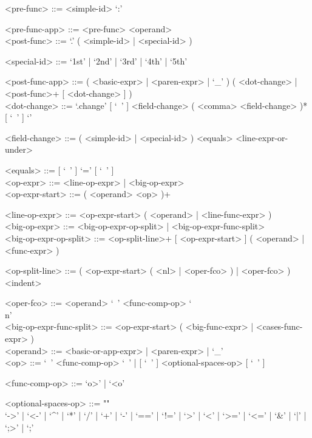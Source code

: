 \documentclass[diploma]{softlab-thesis}
\begin{document}
\begin{grammar}
<pre-func> ::= <simple-id> `:'

<pre-func-app> ::= <pre-func> <operand>
\\

<post-func> ::= `.' ( <simple-id> | <special-id> )

<special-id> ::= `1st' | `2nd' | `3rd' | `4th' | `5th'

<post-func-app> ::=
( <basic-expr> | <paren-expr> | `_' )
( <dot-change> | <post-func>+ [ <dot-change> ] )
\\

<dot-change> ::=
`.change{' [ `\ ' ] <field-change> ( <comma> <field-change> )* [ `\ ' ] `}'

<field-change> ::= ( <simple-id> | <special-id> ) <equals> <line-expr-or-under>

<equals> ::= [ `\ ' ] `=' [ `\ ' ]
\\

<op-expr> ::= <line-op-expr> | <big-op-expr>
\\

<op-expr-start> ::= ( <operand> <op> )+

<line-op-expr> ::= <op-expr-start> ( <operand> | <line-func-expr> )
\\

<big-op-expr> ::=
<big-op-expr-op-split> | <big-op-expr-func-split>
\\

<big-op-expr-op-split> ::=
<op-split-line>+ [ <op-expr-start> ] ( <operand> | <func-expr> )

<op-split-line> ::=
( <op-expr-start> ( <nl> | <oper-fco> ) | <oper-fco> ) <indent>

<oper-fco> ::= <operand> `\ ' <func-comp-op> `\\n'
\\

<big-op-expr-func-split> ::=
<op-expr-start> ( <big-func-expr> | <cases-func-expr> )
\\

<operand> ::= <basic-or-app-expr> | <paren-expr> | `_'
\\

<op> ::= `\ ' <func-comp-op> `\ ' | [ `\ ' ] <optional-spaces-op> [ `\ ' ]

<func-comp-op> ::= `o>' | `<o'

<optional-spaces-op> ::= ""\\
`->' | `<-' | `^' | `*' | `/' | `+' | `-' | `==' | `!=' | `>' | `<' | `>=' |
`<=' | `\&' | `|' | `;>' | `;'
\\


\end{grammar}
\end{document}
